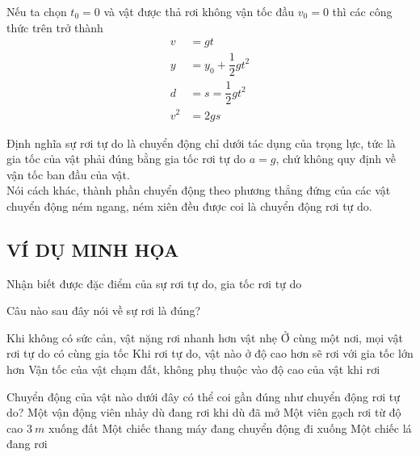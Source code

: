 \begin{tomtat}
	Nếu ta chọn $t_{0}=0$ và vật được thả rơi không vận tốc đầu $v_0=0$ thì các công thức trên trở thành
	\begin{align*}
		v&=gt\\	
		y&=y_0+\dfrac{1}{2}gt^{2}\\
		d&=s=\dfrac{1}{2}gt^{2}\\
		v^2&=2gs
	\end{align*}
	\begin{luuy}
		Định nghĩa sự rơi tự do là chuyển động chỉ dưới tác dụng của trọng lực, tức là gia tốc của vật phải đúng bằng gia tốc rơi tự do $a=g$, chứ không quy định về vận tốc ban đầu của vật. \\
		Nói cách khác, thành phần chuyển động theo phương thẳng đứng của các vật chuyển động ném ngang, ném xiên đều được coi là chuyển động rơi tự do.
	\end{luuy}
	
	
	
\end{tomtat}
\subsection{VÍ DỤ MINH HỌA}
\begin{dang}{Nhận biết được đặc điểm của sự rơi tự do, gia tốc rơi tự do}
\end{dang}
\begin{vd}
	Câu nào sau đây nói về sự rơi là đúng?
	
	\choice
	{Khi không có sức cản, vật nặng rơi nhanh hơn vật nhẹ}
	{\True Ở cùng một nơi, mọi vật rơi tự do có cùng gia tốc}
	{Khi rơi tự do, vật nào ở độ cao hơn sẽ rơi với gia tốc lớn hơn}
	{Vận tốc của vật chạm đất, không phụ thuộc vào độ cao của vật khi rơi}
\end{vd}

\begin{vd}
	Chuyển động của vật nào dưới đây có thể coi gần đúng như chuyển động rơi tự do?
	\choice
	{Một vận động viên nhảy dù đang rơi khi dù đã mở}
	{\True Một viên gạch rơi từ độ cao $\SI{3}{m}$ xuống đất}
	{Một chiếc thang máy đang chuyển động đi xuống}
	{Một chiếc lá đang rơi}
\end{vd}

